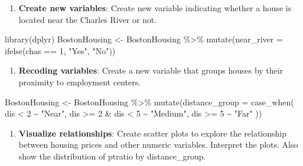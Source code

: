 \documentclass[
]{book}
\newenvironment{Shaded}{\begin{snugshade}}{\end{snugshade}}
\newcommand{\AttributeTok}[1]{\textcolor[rgb]{0.77,0.63,0.00}{#1}}
\newcommand{\AttributeTok}[1]{\textcolor[rgb]{0.13,0.29,0.53}{#1}}
\newcommand{\DecValTok}[1]{\textcolor[rgb]{0.00,0.00,0.81}{#1}}
\newcommand{\FunctionTok}[1]{\textcolor[rgb]{0.00,0.00,0.00}{#1}}
\newcommand{\FunctionTok}[1]{\textcolor[rgb]{0.13,0.29,0.53}{\textbf{#1}}}
\newcommand{\NormalTok}[1]{#1}
\newcommand{\OtherTok}[1]{\textcolor[rgb]{0.56,0.35,0.01}{#1}}
\newcommand{\SpecialCharTok}[1]{\textcolor[rgb]{0.00,0.00,0.00}{#1}}
\newcommand{\SpecialCharTok}[1]{\textcolor[rgb]{0.81,0.36,0.00}{\textbf{#1}}}
\newcommand{\StringTok}[1]{\textcolor[rgb]{0.31,0.60,0.02}{#1}}
\providecommand{\tightlist}{%
  \setlength{\itemsep}{0pt}\setlength{\parskip}{0pt}}
\begin{document}
\begin{enumerate}
\def\labelenumi{\arabic{enumi}.}
\setcounter{enumi}{4}
\tightlist
\item
  \textbf{Create new variables}: Create new variable indicating whether a house is located near the Charles River or not.
\end{enumerate}

\begin{Shaded}
\begin{Highlighting}[]
\FunctionTok{library}\NormalTok{(dplyr)}
\NormalTok{BostonHousing }\OtherTok{\textless{}{-}}\NormalTok{ BostonHousing }\SpecialCharTok{\%\textgreater{}\%}
  \FunctionTok{mutate}\NormalTok{(}\AttributeTok{near\_river =} \FunctionTok{ifelse}\NormalTok{(chas }\SpecialCharTok{==} \DecValTok{1}\NormalTok{, }\StringTok{"Yes"}\NormalTok{, }\StringTok{"No"}\NormalTok{))}
\end{Highlighting}
\end{Shaded}

\begin{enumerate}
\def\labelenumi{\arabic{enumi}.}
\setcounter{enumi}{5}
\tightlist
\item
  \textbf{Recoding variables}: Create a new variable that groups houses by their proximity to employment centers.
\end{enumerate}

\begin{Shaded}
\begin{Highlighting}[]
\NormalTok{BostonHousing }\OtherTok{\textless{}{-}}\NormalTok{ BostonHousing }\SpecialCharTok{\%\textgreater{}\%}
  \FunctionTok{mutate}\NormalTok{(}\AttributeTok{distance\_group =} \FunctionTok{case\_when}\NormalTok{(}
\NormalTok{    dis }\SpecialCharTok{\textless{}} \DecValTok{2} \SpecialCharTok{\textasciitilde{}} \StringTok{"Near"}\NormalTok{,}
\NormalTok{    dis }\SpecialCharTok{\textgreater{}=} \DecValTok{2} \SpecialCharTok{\&}\NormalTok{ dis }\SpecialCharTok{\textless{}} \DecValTok{5} \SpecialCharTok{\textasciitilde{}} \StringTok{"Medium"}\NormalTok{,}
\NormalTok{    dis }\SpecialCharTok{\textgreater{}=} \DecValTok{5} \SpecialCharTok{\textasciitilde{}} \StringTok{"Far"}
\NormalTok{  ))}
\end{Highlighting}
\end{Shaded}

\begin{enumerate}
\def\labelenumi{\arabic{enumi}.}
\setcounter{enumi}{6}
\tightlist
\item
  \textbf{Visualize relationships}: Create scatter plots to explore the relationship between housing prices and other numeric variables. Interpret the plots. Also show the distribution of ptratio by distance\_group.
\end{enumerate}
\end{document}
